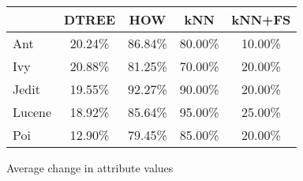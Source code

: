 \begin{figure}[!t]
\centering
{\scriptsize
\begin{tabular}{lcccc}
  \hline
  \rowcolor{lightgray}
       & DTREE & HOW   & kNN   & kNN+FS \\\hline
Ant    & 20.24\% & 86.84\% & 80.00\% & 10.00\%  \\
Ivy    & 20.88\% & 81.25\% & 70.00\% & 20.00\%  \\
Jedit  & 19.55\% & 92.27\% & 90.00\% & 20.00\%  \\
Lucene & 18.92\% & 85.64\% & 95.00\% & 25.00\%  \\
Poi    & 12.90\% & 79.45\% & 85.00\% & 20.00\%   \\\hline
\end{tabular}}
\noindent
\caption{Average change in attribute values}\label{fig:types}
\end{figure}